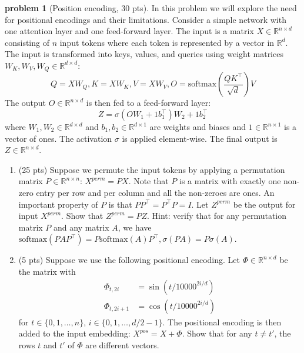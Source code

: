 \documentclass[10pt]{article}
\theoremstyle{definition}
\newtheorem{problem}{\sc\color{cit}problem}
\def\R{\mathbb{R}}%
\def\softmax{\mathrm{softmax}}%
\begin{document}
\begin{problem}[Position encoding, 30 pts]
In this problem we will explore the need for positional encodings
and their limitations. Consider a simple network with one attention
layer and one feed-forward layer. The input is a matrix $X\in\R^{n\times d}$
consisting of $n$ input tokens where each token is represented by
a vector in $\R^{d}$. The input is transformed into keys, values,
and queries using weight matrices $W_{K},W_{V},W_{Q}\in\R^{d\times d}$:
\[
Q=XW_{Q},K=XW_{K},V=XW_{V},O=\softmax\left(\frac{QK^{\top}}{\sqrt{d}}\right)V
\]
The output $O\in\R^{n\times d}$ is then fed to a feed-forward layer:
\[
Z=\sigma(OW_{1}+1b_{1}^{\top})W_{2}+1b_{2}^{\top}
\]
where $W_{1},W_{2}\in\R^{d\times d}$ and $b_{1},b_{2}\in\R^{d\times1}$
are weights and biases and $1\in\R^{n\times1}$ is a vector of ones.
The activation $\sigma$ is applied element-wise. The final output
is $Z\in\R^{n\times d}$.

\begin{enumerate}[label=(\alph*)]
\item (25 pts)  Suppose we permute the input tokens by applying a permutation matrix
$P\in\R^{n\times n}$: $X^{perm}=PX$. Note that $P$ is a matrix
with exactly one non-zero entry per row and per column and all the
non-zeroes are ones. An important property of $P$ is that $PP^{\top}=P^{\top}P=I$.
Let $Z^{perm}$ be the output for input $X^{perm}$. Show that $Z^{perm}=PZ$.
Hint: verify that for any permutation matrix $P$ and any matrix $A$,
we have $\softmax(PAP^{\top})=P\softmax(A)P^{\top},\sigma(PA)=P\sigma(A)$.
\item (5 pts) Suppose we use the following positional encoding. Let $\Phi\in\R^{n\times d}$
be the matrix with 
\begin{align*}
\Phi_{t,2i} & =\sin\left(t/10000^{2i/d}\right)\\
\Phi_{t,2i+1} & =\cos\left(t/10000^{2i/d}\right)
\end{align*}
 for $t\in\{0,1,\ldots,n\}$, $i\in\{0,1,\ldots,d/2-1\}$. The positional
encoding is then added to the input embedding: $X^{pos}=X+\Phi$.
Show that for any $t\ne t'$, the rows $t$ and $t'$ of $\Phi$ are
different vectors.
\end{enumerate}
\end{problem}
\end{document}
